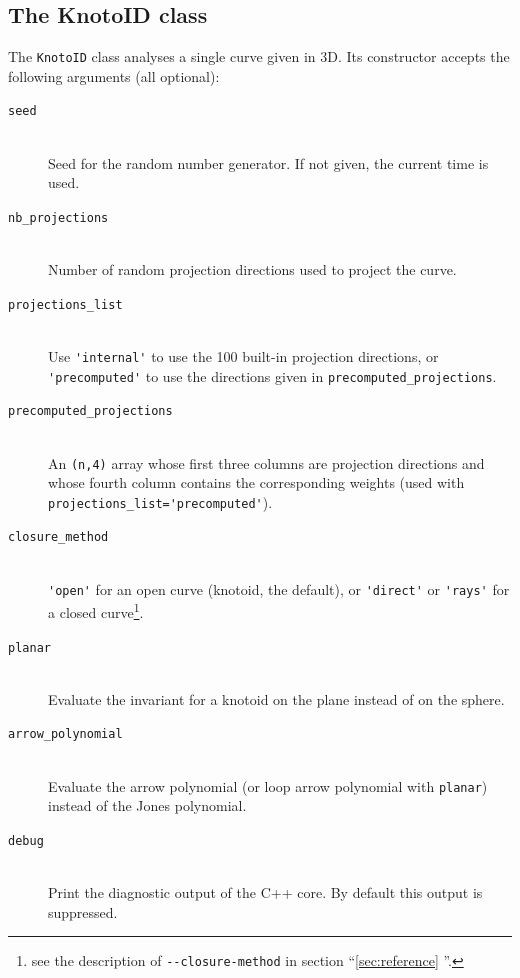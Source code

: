 \subsection{\label{sec:python:knotoid}The KnotoID class}
The \lstinline{KnotoID} class analyses a single curve given in 3D. Its constructor accepts the following arguments (all optional):
\begin{description}
\item[\lstinline{seed}]\hfill\\
  Seed for the random number generator. If not given, the current time is used.
\item[\lstinline{nb_projections}]\hfill\\
  Number of random projection directions used to project the curve.
\item[\lstinline{projections_list}]\hfill\\
  Use \lstinline{'internal'} to use the 100 built-in projection directions, or \lstinline{'precomputed'} to use the directions given in \lstinline{precomputed_projections}.
\item[\lstinline{precomputed_projections}]\hfill\\
  An \lstinline{(n,4)} array whose first three columns are projection directions and whose fourth column contains the corresponding weights (used with \lstinline{projections_list='precomputed'}).
\item[\lstinline{closure_method}]\hfill\\
  \lstinline{'open'} for an open curve (knotoid, the default), or \lstinline{'direct'} or \lstinline{'rays'} for a closed curve\footnote{see the description of \lstinline{--closure-method} in section ``\ref{sec:reference} ''.}.
\item[\lstinline{planar}]\hfill\\
  Evaluate the invariant for a knotoid on the plane instead of on the sphere.
\item[\lstinline{arrow_polynomial}]\hfill\\
  Evaluate the arrow polynomial (or loop arrow polynomial with \lstinline{planar}) instead of the Jones polynomial.
\item[\lstinline{debug}]\hfill\\
  Print the diagnostic output of the C++ core. By default this output is suppressed.
\end{description}

